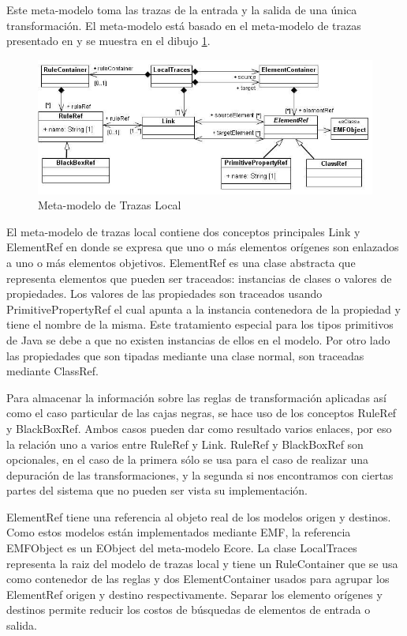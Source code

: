 \documentclass[a4paper,12pt,oneside]{book}
\begin{document}
Este meta-modelo toma las trazas de la entrada y la salida de una única transformación. El meta-modelo está basado en el meta-modelo de trazas presentado en \cite{Jouault} y se muestra en el dibujo \ref{fig:LocalTraceMetamodel}.

\begin{figure}[hbtp]
\centering
\includegraphics[scale=.55]{./img/LocalTraceMetamodel}
\caption{Meta-modelo de Trazas Local}
\label{fig:LocalTraceMetamodel}
\end{figure}

El meta-modelo de trazas local contiene dos conceptos principales Link y ElementRef en donde se expresa que uno o más elementos orígenes son enlazados a uno o más elementos objetivos. ElementRef es una clase abstracta que representa elementos que pueden ser traceados: instancias de clases o valores de propiedades. Los valores de las propiedades son traceados usando PrimitivePropertyRef el cual apunta a la instancia contenedora de la propiedad y tiene el nombre de la misma. Este tratamiento especial para los tipos primitivos de Java se debe a que no existen instancias de ellos en el modelo. Por otro lado las propiedades que son tipadas mediante una clase normal, son traceadas mediante ClassRef.

Para almacenar la información sobre las reglas de transformación aplicadas así como el caso particular de las cajas negras, se hace uso de los conceptos RuleRef y BlackBoxRef. Ambos casos pueden dar como resultado varios enlaces, por eso la relación uno a varios entre RuleRef y Link. RuleRef y BlackBoxRef son opcionales, en el caso de la primera sólo se usa para el caso de realizar una depuración de las transformaciones, y la segunda si nos encontramos con ciertas partes del sistema que no pueden ser vista su implementación.

ElementRef tiene una referencia al objeto real de los modelos origen y destinos. Como estos modelos están implementados mediante EMF, la referencia EMFObject es un EObject del meta-modelo Ecore. La clase LocalTraces representa la raiz del modelo de trazas local y tiene un RuleContainer que se usa como contenedor de las reglas y dos ElementContainer usados para agrupar los ElementRef origen y destino respectivamente. Separar los elemento orígenes y destinos permite reducir los costos de búsquedas de elementos de entrada o salida.
\end{document}
